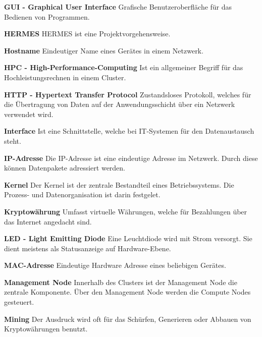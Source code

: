\textbf{GUI - Graphical User Interface}\newline
Grafische Benutzeroberfläche für das Bedienen von Programmen.

\textbf{HERMES}\newline
HERMES ist eine Projektvorgehensweise.

\textbf{Hostname}\newline
Eindeutiger Name eines Gerätes in einem Netzwerk.

\textbf{HPC - High-Performance-Computing}\newline
Ist ein allgemeiner Begriff für das Hochleistungsrechnen in einem Cluster.

\textbf{HTTP - Hypertext Transfer Protocol}\newline
Zustandsloses Protokoll, welches für die Übertragung von Daten auf der Anwendungsschicht über ein Netzwerk verwendet wird.

\textbf{Interface}\newline
Ist eine Schnittstelle, welche bei IT-Systemen für den Datenaustausch steht.

\textbf{IP-Adresse}\newline
Die IP-Adresse ist eine eindeutige Adresse im Netzwerk. Durch diese können Datenpakete adressiert werden. 

\textbf{Kernel}\newline
Der Kernel ist der zentrale Bestandteil eines Betriebssystems. Die Prozess- und Datenorganisation ist darin festgelet.

\textbf{Kryptowährung}\newline
Umfasst virtuelle Währungen, welche für Bezahlungen über das Internet angedacht sind.

\textbf{LED - Light Emitting Diode}\newline
Eine Leuchtdiode wird mit Strom versorgt. Sie dient meistens als Statusanzeige auf Hardware-Ebene.

\textbf{MAC-Adresse}\newline 
Eindeutige Hardware Adresse eines beliebigen Gerätes.

\textbf{Management Node}\newline
Innerhalb des Clusters ist der Management Node die zentrale Komponente. Über den Management Node werden die Compute Nodes gesteuert.

\textbf{Mining}\newline
Der Ausdruck wird oft für das Schürfen, Generieren oder Abbauen von Kryptowährungen benutzt.

